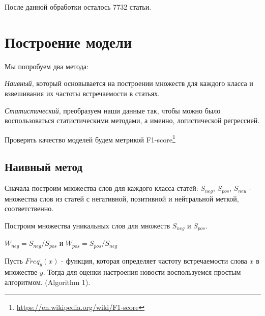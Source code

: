 \documentclass[12pt]{article}
\begin{document}
        После данной обработки осталось 7732 статьи.

    \section{Построение модели}
        Мы попробуем два метода: 
        
        \textit{Наивный}, который основывается на построении множеств для каждого класса и взвешивания их 
        частоты встречаемости в статьях. 
        
        \textit{Статистический}, преобразуем наши данные так, чтобы можно было 
        воспользоваться статистическими методами, а именно, логистической регрессией.

        Проверять качество моделей будем метрикой F1-score\footnote{\href{https://en.wikipedia.org/wiki/F1\_score}{https://en.wikipedia.org/wiki/F1-score}}

        \subsection{Наивный метод}
            Сначала построим множества слов для каждого класса статей: $S_{neg}$,
            $S_{pos}$, $S_{neu}$ - множества слов из статей с негативной, 
            позитивной и нейтральной меткой, соответственно.

            Построим множества уникальных слов для множеств $S_{neg}$ и $S_{pos}$.
            \begin{center}
                $W_{neg} = S_{neg} / S_{pos}$ и $W_{pos} = S_{pos} / S_{neg}$
            \end{center}

            Пусть $Freq_y(x)$ - функция, которая определяет частоту встречаемости слова $x$
            в множестве $y$. Тогда для оценки настроения новости воспользуемся простым алгоритмом.
            (Algorithm 1). 
            
\end{document}
